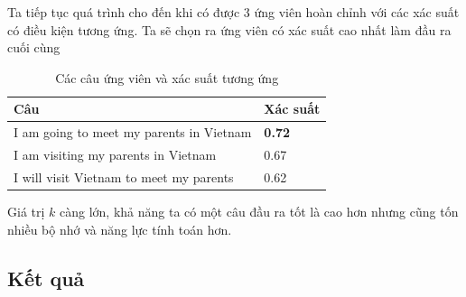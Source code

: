 \documentclass[14pt, a4paper]{article}
\numberwithin{equation}{section}
\numberwithin{algorithm}{section}
\numberwithin{figure}{section}
\numberwithin{table}{section}
\numberwithin{dl}{section}
\numberwithin{md}{section}
\numberwithin{bd}{section}
\numberwithin{dn}{section}
\numberwithin{hq}{section}
\begin{document}
\begin{enumerate} [label=(\alph*)]
\begin{figure}[h!]
        \end{figure}

        Ta tiếp tục quá trình cho đến khi có được 3 ứng viên hoàn chỉnh với các xác suất có điều kiện tương ứng.
        Ta sẽ chọn ra ứng viên có xác suất cao nhất làm đầu ra cuối cùng

        \begin{table}[h!]
            \centering\begin{tabular}{|l|l|}
            \hline
            Câu & Xác suất \\ \hline
            I am going to meet my parents in Vietnam & \textbf{0.72} \\ \hline
            I am visiting my parents in Vietnam & 0.67 \\ \hline
            I will visit Vietnam to meet my parents & 0.62 \\ \hline
            \end{tabular}
            \caption{Các câu ứng viên và xác suất tương ứng}
        \end{table}

        Giá trị $k$ càng lớn, khả năng ta có một câu đầu ra tốt là cao hơn nhưng cũng tốn nhiều bộ nhớ và năng lực tính toán hơn.

    \end{enumerate}

    \subsection{Kết quả}

    \newpage
    \printbibliography[title={TÀI LIỆU THAM KHẢO}]

\end{document}
